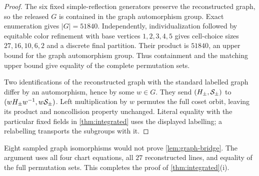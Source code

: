 \begin{proof}
The six fixed simple-reflection generators preserve the reconstructed graph,
so the released $G$ is contained in the graph automorphism group.  Exact
enumeration gives $|G|=51840$.  Independently, individualization followed by
equitable color refinement with base vertices $1,2,3,4,5$ gives cell-choice
sizes $27,16,10,6,2$ and a discrete final partition.  Their product is
$51840$, an upper bound for the graph automorphism group.  Thus containment
and the matching upper bound give equality of the complete permutation sets.

Two identifications of the reconstructed graph with the standard labelled
graph differ by an automorphism, hence by some $w\in G$.  They send
$(H_\pm,\mathcal{S}_\pm)$ to $(wH_\pm w^{-1},w\mathcal{S}_\pm)$.  Left multiplication by
$w$ permutes the full coset orbit, leaving its product and noncollision
property unchanged.  Literal equality with the particular fixed fields in
\cref{thm:integrated} uses the displayed labelling; a relabelling transports
the subgroups with it.
\end{proof}

Eight sampled graph isomorphisms would not prove
\cref{lem:graph-bridge}.  The argument uses all four chart equations, all
$27$ reconstructed lines, and equality of the full permutation sets.  This
completes the proof of \cref{thm:integrated}(i).

\FloatBarrier

\FloatBarrier
